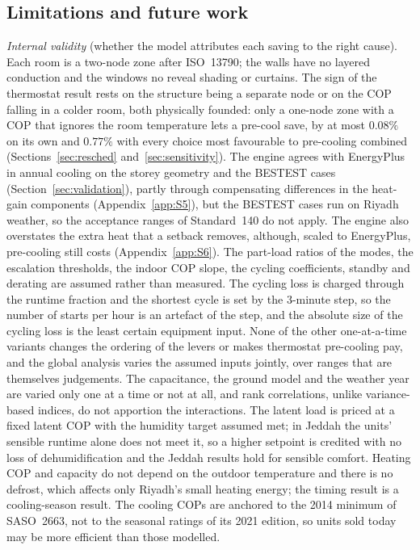 \documentclass[10pt,a4paper,twocolumn]{article}
\theoremstyle{definition}
\begin{document}
\subsection{Limitations and future work}\label{sec:limitations}
\emph{Internal validity} (whether the model attributes each saving to the right cause). Each room is a two-node zone after ISO~13790; the walls have no layered conduction and the windows no reveal shading or curtains. The sign of the thermostat result rests on the structure being a separate node or on the COP falling in a colder room, both physically founded: only a one-node zone with a COP that ignores the room temperature lets a pre-cool save, by at most $0.08\%$ on its own and $0.77\%$ with every choice most favourable to pre-cooling combined (Sections~\ref{sec:resched} and~\ref{sec:sensitivity}). The engine agrees with EnergyPlus in annual cooling on the storey geometry and the BESTEST cases (Section~\ref{sec:validation}), partly through compensating differences in the heat-gain components (Appendix~\ref{app:S5}), but the BESTEST cases run on Riyadh weather, so the acceptance ranges of Standard~140 do not apply. The engine also overstates the extra heat that a setback removes, although, scaled to EnergyPlus, pre-cooling still costs (Appendix~\ref{app:S6}). The part-load ratios of the modes, the escalation thresholds, the indoor COP slope, the cycling coefficients, standby and derating are assumed rather than measured. The cycling loss is charged through the runtime fraction and the shortest cycle is set by the $3$-minute step, so the number of starts per hour is an artefact of the step, and the absolute size of the cycling loss is the least certain equipment input. None of the other one-at-a-time variants changes the ordering of the levers or makes thermostat pre-cooling pay, and the global analysis varies the assumed inputs jointly, over ranges that are themselves judgements. The capacitance, the ground model and the weather year are varied only one at a time or not at all, and rank correlations, unlike variance-based indices, do not apportion the interactions. The latent load is priced at a fixed latent COP with the humidity target assumed met; in Jeddah the units' sensible runtime alone does not meet it, so a higher setpoint is credited with no loss of dehumidification and the Jeddah results hold for sensible comfort. Heating COP and capacity do not depend on the outdoor temperature and there is no defrost, which affects only Riyadh's small heating energy; the timing result is a cooling-season result. The cooling COPs are anchored to the 2014 minimum of SASO~2663, not to the seasonal ratings of its 2021 edition, so units sold today may be more efficient than those modelled.
\end{document}
